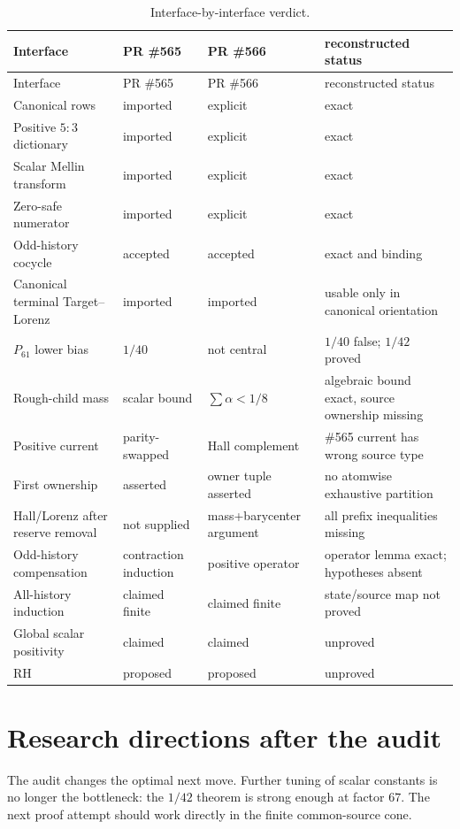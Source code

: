 \documentclass[11pt]{article}
\newcommand{\1}{\mathbf 1}
\begin{document}
\begin{longtable}{p{}p{}p{}p{}}
\caption{Interface-by-interface verdict.}\label{tab:verdict}\\
\toprule
Interface & PR \#565 & PR \#566 & reconstructed status\\
\midrule
\endfirsthead
\toprule
Interface & PR \#565 & PR \#566 & reconstructed status\\
\midrule
\endhead
Canonical rows & imported & explicit & exact\\
Positive $5{:}3$ dictionary & imported & explicit & exact\\
Scalar Mellin transform & imported & explicit & exact\\
Zero-safe numerator & imported & explicit & exact\\
Odd-history cocycle & accepted & accepted & exact and binding\\
Canonical terminal Target--Lorenz & imported & imported & usable only in canonical orientation\\
$P_{61}$ lower bias & $1/40$ & not central & $1/40$ false; $1/42$ proved\\
Rough-child mass & scalar bound & $\sum\alpha<1/8$ & algebraic bound exact, source ownership missing\\
Positive current & parity-swapped & Hall complement & \#565 current has wrong source type\\
First ownership & asserted & owner tuple asserted & no atomwise exhaustive partition\\
Hall/Lorenz after reserve removal & not supplied & mass+barycenter argument & all prefix inequalities missing\\
Odd-history compensation & contraction induction & positive operator & operator lemma exact; hypotheses absent\\
All-history induction & claimed finite & claimed finite & state/source map not proved\\
Global scalar positivity & claimed & claimed & unproved\\
RH & proposed & proposed & unproved\\
\bottomrule
\end{longtable}

\section{Research directions after the audit}

The audit changes the optimal next move.  Further tuning of scalar constants is no longer the bottleneck: the $1/42$ theorem is strong enough at factor $67$.  The next proof attempt should work directly in the finite common-source cone.
\end{document}
